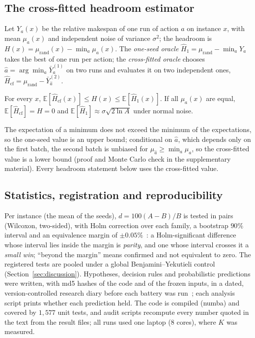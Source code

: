 \subsection{The cross-fitted headroom estimator}
\label{sec:estimator}
Let $Y_a(x)$ be the relative makespan of one run of action $a$ on instance $x$, with mean $\mu_a(x)$ and independent noise of variance $\sigma^2$; the headroom is $H(x)=\mu_{\mathrm{rand}}(x)-\min_a\mu_a(x)$. The \emph{one-seed oracle} $\hat H_1=\mu_{\mathrm{rand}}-\min_aY_a$ takes the best of one run per action; the \emph{cross-fitted oracle} chooses $\hat a=\arg\min_a\bar Y_a^{(1)}$ on two runs and evaluates it on two independent ones, $\hat H_{\mathrm{cf}}=\mu_{\mathrm{rand}}-\bar Y_{\hat a}^{(2)}$.
\begin{proposition}
\label{prop:bounds}
For every $x$, $\mathbb E[\hat H_{\mathrm{cf}}(x)]\le H(x)\le\mathbb E[\hat H_1(x)]$. If all $\mu_a(x)$ are equal, $\mathbb E[\hat H_{\mathrm{cf}}]=H=0$ and $\mathbb E[\hat H_1]\approx\sigma\sqrt{2\ln A}$ under normal noise.
\end{proposition}
The expectation of a minimum does not exceed the minimum of the expectations, so the one-seed value is an upper bound; conditional on $\hat a$, which depends only on the first batch, the second batch is unbiased for $\mu_{\hat a}\ge\min_a\mu_a$, so the cross-fitted value is a lower bound (proof and Monte Carlo check in the supplementary material). Every headroom statement below uses the cross-fitted value.

\subsection{Statistics, registration and reproducibility}
\label{sec:stats}
Per instance (the mean of the seeds), $d=100(A-B)/B$ is tested in pairs (Wilcoxon, two-sided), with Holm correction over each family, a bootstrap $90\%$ interval and an equivalence margin of $\pm0.05\%$~\cite{Lakens2017}: a Holm-significant difference whose interval lies inside the margin is \emph{parity}, and one whose interval crosses it a \emph{small win}; ``beyond the margin'' means confirmed and not equivalent to zero. The registered tests are pooled under a global Benjamini--Yekutieli control (Section~\ref{sec:discussion}). Hypotheses, decision rules and probabilistic predictions were written, with md5 hashes of the code and of the frozen inputs, in a dated, version-controlled research diary before each battery was run~\cite{NosekEtal2018}; each analysis script prints whether each prediction held. The code is compiled (numba) and covered by $1{,}577$ unit tests, and audit scripts recompute every number quoted in the text from the result files; all runs used one laptop (8 cores), where $K$ was measured.
